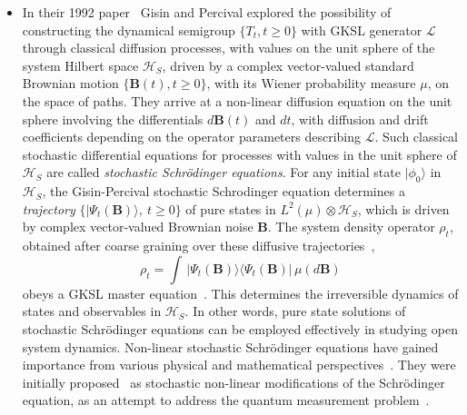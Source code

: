 \begin{itemize}
\item In their 1992 paper~\cite{chap8-key9} Gisin and Percival explored the possibility of constructing the dynamical semigroup $\{T_t,t\geq 0\}$ with GKSL generator $\mathcal{L}$ through classical diffusion processes, with  values on the unit sphere of the system Hilbert space $\mathcal{H}_S$, driven by a complex vector-valued standard Brownian motion $\{\mathbf{B}(t), t\geq 0\}$, with its Wiener probability measure $\mu$, on the space of paths. They arrive at a non-linear diffusion equation on the unit sphere involving the differentials $d\mathbf{B}(t)$ and $dt$, with diffusion and drift coefficients depending on the operator parameters describing $\mathcal{L}$. Such classical stochastic differential equations for processes with values in the unit sphere of $\mathcal{H}_S$ are called {\it stochastic Schr{\"o}dinger equations}.  For any initial state $\vert \phi_0\rangle$ in $\mathcal{H}_S$, the Gisin-Percival stochastic Schrodinger equation determines a {\it trajectory}   
$\{\vert\Psi_t(\mathbf{B})\rangle,\ t\geq 0\}$ of pure states in $L^2(\mu)\otimes \mathcal{H}_S$, which is driven by complex vector-valued Brownian noise $\mathbf{B}$. The system density operator $\rho_t$, obtained after coarse graining over these diffusive trajectories~\cite{chap8-key10},
$$
\rho_t=\int\, \vert \Psi_t(\mathbf{B})\rangle\langle \Psi_t(\mathbf{B})\vert\, \mu(d\mathbf{B})
$$
 obeys a GKSL master equation~\cite{chap8-key1,chap8-key2}. This determines the irreversible dynamics of states and observables in $\mathcal{H}_S$. In other words, pure state solutions of stochastic Schr{\"o}dinger equations can be  employed   effectively in studying open system dynamics.  Non-linear stochastic Schr{\"o}dinger equations have gained importance from various physical and mathematical  perspectives~\cite{chap8-key9,chap8-key10,chap8-key11,chap8-key12,chap8-key13,chap8-key14,chap8-key15,chap8-key16,chap8-key17,chap8-key18,chap8-key19,chap8-key20,chap8-key21,chap8-key22,chap8-key23,chap8-key24,chap8-key25,chap8-key26,chap8-key27,chap8-key28}. They were initially proposed~\cite{chap8-key15} as  stochastic non-linear modifications of the Schr{\"o}dinger equation, as an attempt to address the quantum measurement problem~\cite{chap8-key10,chap8-key11,chap8-key12,chap8-key13,chap8-key14,chap8-key15, chap8-key17, chap8-key22,chap8-key23,chap8-key24, chap8-key27,chap8-key28,chap8-key29,chap8-key30,chap8-key31}. 
\end{itemize}

